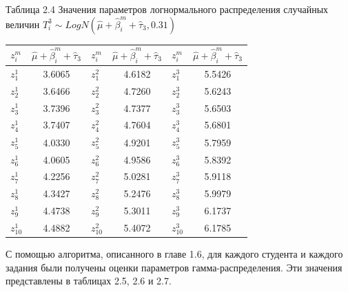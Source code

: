 \documentclass[14pt, a4paper]{extarticle}
\numberwithin{equation}{section}
\begin{document}
{\begin{table}[h!]
\centering
\begin{flushright}
Таблица 2.4 Значения параметров логнормального распределения случайных величин $T_i^3 \sim LogN(\hat{\mu}+\hat{\beta}_i^m+\hat{\tau}_3,0.31)$
\end{flushright}
\begin{tabular}{|>{\centering}m{57pt}|c|>{\centering}m{57pt}|c|>{\centering}m{57pt}|c|}
\hline
$z_i^m$ 	&$\hat{\mu}+\hat{\beta}_i^m+\hat{\tau}_3$ & $z_i^m$	& $\hat{\mu}+\hat{\beta}_i^m+\hat{\tau}_3$ & $z_i^m$ & $\hat{\mu}+\hat{\beta}_i^m+\hat{\tau}_3$	\\ \hline
$z_1^1$		& 3.6065	& $z_1^2$		& 4.6182	& $z_1^3$		& 5.5426 \\ \hline
$z_2^1$		& 3.6466	& $z_2^2$		& 4.7260	& $z_2^3$		& 5.6243 \\ \hline
$z_3^1$		& 3.7396	& $z_3^2$		& 4.7377	& $z_3^3$		& 5.6503 \\ \hline
$z_4^1$		& 3.7407	& $z_4^2$		& 4.7604	& $z_4^3$		& 5.6801 \\ \hline
$z_5^1$		& 4.0330	& $z_5^2$		& 4.9201	& $z_5^3$		& 5.7959 \\ \hline
$z_6^1$		& 4.0605	& $z_6^2$		& 4.9586	& $z_6^3$		& 5.8392 \\ \hline
$z_7^1$		& 4.2256	& $z_7^2$		& 5.0281	& $z_7^3$		& 5.9118 \\ \hline
$z_8^1$		& 4.3427	& $z_8^2$		& 5.2476	& $z_8^3$		& 5.9979 \\ \hline
$z_9^1$		& 4.4738	& $z_9^2$		& 5.3011	& $z_9^3$		& 6.1737 \\ \hline
$z_{10}^1$	& 4.4882	& $z_{10}^2$	& 5.4072	& $z_{10}^3$	& 6.1785 \\ \hline
\end{tabular}
\label{ch2}
\end{table}

С помощью алгоритма, описанного в главе 1.6,  для каждого студента и каждого задания были получены оценки параметров гамма-распределения. Эти значения представлены в таблицах 2.5, 2.6 и 2.7.
\newpage

}
\end{document}
